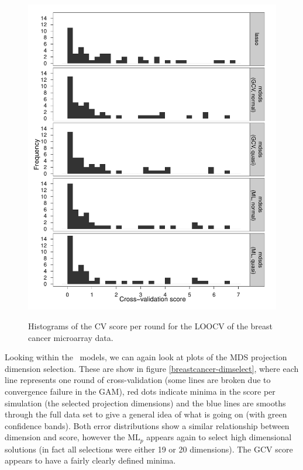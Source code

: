 \begin{figure}
\centering
\includegraphics[width=6in]{gds/figs/breastcancer-cv-plot.pdf} \\
\caption{Histograms of the CV score per round for the LOOCV of the breast cancer microarray data.}
\label{breast-cancer-cv-plot}
\end{figure}

Looking within the \mdsds\ models, we can again look at plots of the MDS projection dimension selection. These are show in figure \ref{breastcancer-dimselect}, where each line represents one round of cross-validation (some lines are broken due to convergence failure in the GAM), red dots indicate minima in the score per simulation (the selected projection dimensions) and the blue lines are smooths through the full data set to give a general idea of what is going on (with green confidence bands). Both error distributions show a similar relationship between dimension and score, however the $\text{ML}_p$ appears again to select high dimensional solutions (in fact all selections were either 19 or 20 dimensions). The GCV score appears to have a fairly clearly defined minima. 

